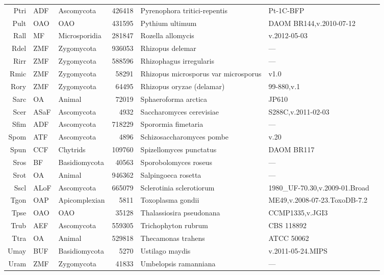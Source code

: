 {{{\begin{longtable}{rllrlll}
  Ptri & ADF & Ascomycota & 426418 & Pyrenophora tritici-repentis & Pt-1C-BFP & \cite{Ptri} \\ 
  Pult & OAO & OAO & 431595 & Pythium ultimum & DAOM BR144,v.2010-07-12 & \cite{Pult} \\ 
  Rall & MF & Microsporidia & 281847 & Rozella allomycis & v.2012-05-03 & \cite{Rall} \\ 
  Rdel & ZMF & Zygomycota & 936053 & Rhizopus delemar & --- & \cite{Rdel} \\ 
  Rirr & ZMF & Zygomycota & 588596 & Rhizophagus irregularis & --- & \cite{Rirr} \\ 
  Rmic & ZMF & Zygomycota & 58291 & Rhizopus microsporus var microsporus & v1.0 & \cite{Rmic} \\ 
  Rory & ZMF & Zygomycota & 64495 & Rhizopus oryzae (delamar) & 99-880,v.1 & \cite{Rory} \\ 
  Sarc & OA & Animal & 72019 & Sphaeroforma arctica  & JP610 & \cite{Sarc} \\ 
  Scer & ASaF & Ascomycota & 4932 & Saccharomyces cerevisiae & S288C,v.2011-02-03 & \cite{Scer} \\ 
  Sfim & ADF & Ascomycota & 718229 & Sporormia fimetaria & --- & \cite{Sfim} \\ 
  Spom & ATF & Ascomycota & 4896 & Schizosaccharomyces pombe & v.20 & \cite{Spom} \\ 
  Spun & CCF & Chytrids & 109760 & Spizellomyces punctatus & DAOM BR117 & \cite{Spun} \\ 
  Sros & BF & Basidiomycota & 40563 & Sporobolomyces roseus & --- & \cite{Sros} \\ 
  Srot & OA & Animal & 946362 & Salpingoeca rosetta & --- & \cite{Srot} \\ 
  Sscl & ALoF & Ascomycota & 665079 & Sclerotinia sclerotiorum & 1980\_UF-70.30,v.2009-01.Broad & \cite{Sscl} \\ 
  Tgon & OAP & Apicomplexian & 5811 & Toxoplasma gondii & ME49,v.2008-07-23.ToxoDB-7.2 & \cite{Tgon} \\ 
  Tpse & OAO & OAO & 35128 & Thalassiosira pseudonana & CCMP1335,v.JGI3 & \cite{Tpse} \\ 
  Trub & AEF & Ascomycota & 559305 & Trichophyton rubrum & CBS 118892 & \cite{Trub} \\ 
  Ttra & OA & Animal & 529818 & Thecamonas trahens & ATCC 50062 & \cite{Ttra} \\ 
  Umay & BUF & Basidiomycota & 5270 & Ustilago maydis & v.2011-05-24.MIPS & \cite{Umay} \\ 
  Uram & ZMF & Zygomycota & 41833 & Umbelopsis ramanniana & --- & \cite{Uram} \\ 

\end{longtable}}}}

